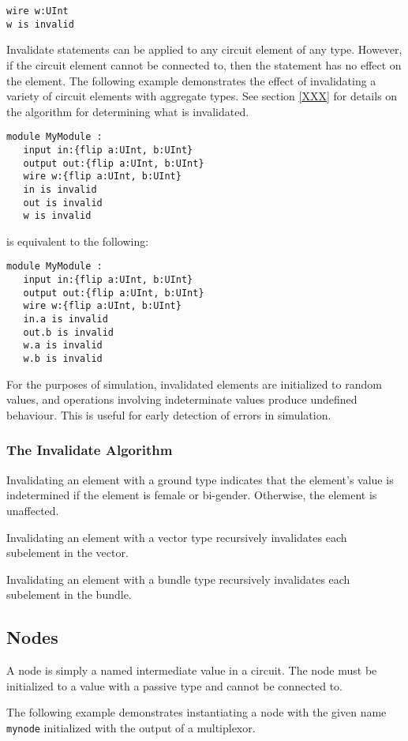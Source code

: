 \documentclass[12pt]{article}
\begin{document}
\begin{verbatim}
wire w:UInt
w is invalid
\end{verbatim}

Invalidate statements can be applied to any circuit element of any type. However, if the circuit element cannot be connected to, then the statement has no effect on the element. The following example demonstrates the effect of invalidating a variety of circuit elements with aggregate types. See section \ref{XXX} for details on the algorithm for determining what is invalidated.

\begin{verbatim}
module MyModule :
   input in:{flip a:UInt, b:UInt}
   output out:{flip a:UInt, b:UInt}
   wire w:{flip a:UInt, b:UInt}
   in is invalid
   out is invalid
   w is invalid
\end{verbatim}
is equivalent to the following:
\begin{verbatim}
module MyModule :
   input in:{flip a:UInt, b:UInt}
   output out:{flip a:UInt, b:UInt}
   wire w:{flip a:UInt, b:UInt}
   in.a is invalid
   out.b is invalid
   w.a is invalid
   w.b is invalid
\end{verbatim}

For the purposes of simulation, invalidated elements are initialized to random values, and operations involving indeterminate values produce undefined behaviour. This is useful for early detection of errors in simulation.

\subsubsection{The Invalidate Algorithm}
Invalidating an element with a ground type indicates that the element's value is indetermined if the element is female or bi-gender. Otherwise, the element is unaffected.

Invalidating an element with a vector type recursively invalidates each subelement in the vector.

Invalidating an element with a bundle type recursively invalidates each subelement in the bundle.

\subsection{Nodes}
A node is simply a named intermediate value in a circuit. The node must be initialized to a value with a passive type and cannot be connected to. 

The following example demonstrates instantiating a node with the given name \verb|mynode| initialized with the output of a multiplexor. 
\end{document}
